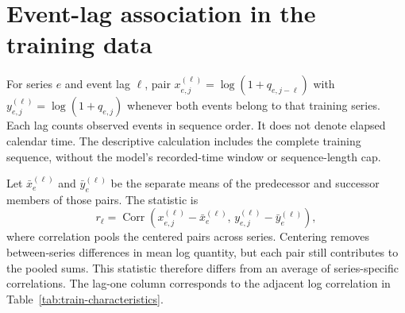 \documentclass[runningheads]{llncs}
\begin{document}
\section{Event-lag association in the training data}
\label{app:lag}
For series $e$ and event lag $\ell$, pair
$x^{(\ell)}_{e,j}=\log(1+q_{e,j-\ell})$ with
$y^{(\ell)}_{e,j}=\log(1+q_{e,j})$ whenever both events belong to that
training series. Each lag counts observed events in sequence order.
It does not denote elapsed calendar time. The descriptive calculation
includes the complete training sequence, without the model's recorded-time
window or sequence-length cap.

Let $\bar x_e^{(\ell)}$ and $\bar y_e^{(\ell)}$ be the separate means
of the predecessor and successor members of those pairs. The statistic is
\begin{equation}
 r_{\ell}=\operatorname{Corr}\!\left(
 x^{(\ell)}_{e,j}-\bar x_e^{(\ell)},\,
 y^{(\ell)}_{e,j}-\bar y_e^{(\ell)}\right),
 \label{eq:train-lag-correlation}
\end{equation}
where correlation pools the centered pairs across series. Centering removes
between-series differences in mean log quantity, but each pair still
contributes to the pooled sums. This statistic therefore differs
from an average of series-specific correlations. The lag-one column
corresponds to the adjacent log correlation in
Table~\ref{tab:train-characteristics}.
\end{document}
